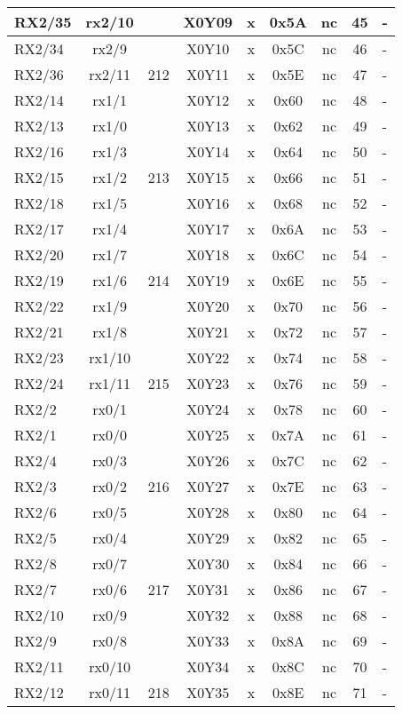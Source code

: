 \begin{longtable}{|l|c|c|c|c|c|c|c|l|}
RX2/35 & rx2/10 &     & X0Y09 &  x  & 0x5A & nc & 45 & -\\\hline
RX2/34 & rx2/9  &     & X0Y10 &  x  & 0x5C & nc & 46 & -\\\hline
RX2/36 & rx2/11 & 212 & X0Y11 &  x  & 0x5E & nc & 47 & -\\\hline
RX2/14 & rx1/1  &     & X0Y12 &  x  & 0x60 & nc & 48 & -\\\hline
RX2/13 & rx1/0  &     & X0Y13 &  x  & 0x62 & nc & 49 & -\\\hline
RX2/16 & rx1/3  &     & X0Y14 &  x  & 0x64 & nc & 50 & -\\\hline
RX2/15 & rx1/2  & 213 & X0Y15 &  x  & 0x66 & nc & 51 & -\\\hline
RX2/18 & rx1/5  &     & X0Y16 &  x  & 0x68 & nc & 52 & -\\\hline
RX2/17 & rx1/4  &     & X0Y17 &  x  & 0x6A & nc & 53 & -\\\hline
RX2/20 & rx1/7  &     & X0Y18 &  x  & 0x6C & nc & 54 & -\\\hline
RX2/19 & rx1/6  & 214 & X0Y19 &  x  & 0x6E & nc & 55 & -\\\hline
RX2/22 & rx1/9  &     & X0Y20 &  x  & 0x70 & nc & 56 & -\\\hline
RX2/21 & rx1/8  &     & X0Y21 &  x  & 0x72 & nc & 57 & -\\\hline
RX2/23 & rx1/10 &     & X0Y22 &  x  & 0x74 & nc & 58 & -\\\hline
RX2/24 & rx1/11 & 215 & X0Y23 &  x  & 0x76 & nc & 59 & -\\\hline
RX2/2  & rx0/1  &     & X0Y24 &  x  & 0x78 & nc & 60 & -\\\hline
RX2/1  & rx0/0  &     & X0Y25 &  x  & 0x7A & nc & 61 & -\\\hline
RX2/4  & rx0/3  &     & X0Y26 &  x  & 0x7C & nc & 62 & -\\\hline
RX2/3  & rx0/2  & 216 & X0Y27 &  x  & 0x7E & nc & 63 & -\\\hline
RX2/6  & rx0/5  &     & X0Y28 &  x  & 0x80 & nc & 64 & -\\\hline
RX2/5  & rx0/4  &     & X0Y29 &  x  & 0x82 & nc & 65 & -\\\hline
RX2/8  & rx0/7  &     & X0Y30 &  x  & 0x84 & nc & 66 & -\\\hline
RX2/7  & rx0/6  & 217 & X0Y31 &  x  & 0x86 & nc & 67 & -\\\hline
RX2/10 & rx0/9  &     & X0Y32 &  x  & 0x88 & nc & 68 & -\\\hline
RX2/9  & rx0/8  &     & X0Y33 &  x  & 0x8A & nc & 69 & -\\\hline
RX2/11 & rx0/10 &     & X0Y34 &  x  & 0x8C & nc & 70 & -\\\hline
RX2/12 & rx0/11 & 218 & X0Y35 &  x  & 0x8E & nc & 71 & -\\\hline
\end{longtable}

